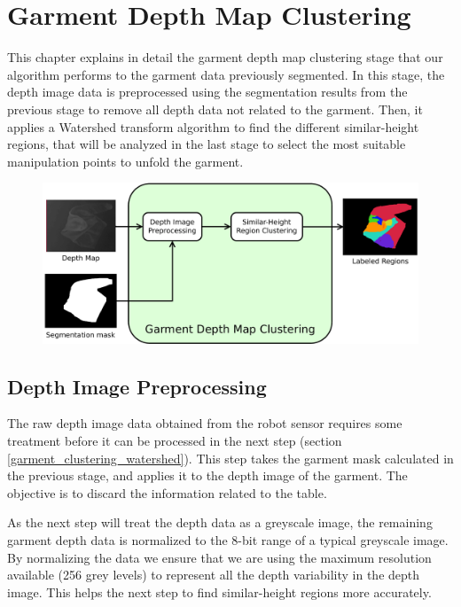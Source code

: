 \chapter{Garment Depth Map Clustering}
\label{garment_clustering}

This chapter explains in detail the garment depth map clustering stage that our algorithm performs to the garment data previously segmented. In this stage, the depth image data is preprocessed using the segmentation results from the previous stage to remove all depth data not related to the garment. Then, it applies a Watershed transform algorithm to find the different similar-height regions, that will be analyzed in the last stage to select the most suitable manipulation points to unfold the garment. 

\begin{figure}[thpb]
    \centering
    \includegraphics[width=\textwidth]
    {figures/Garment-depthmap-diagram.pdf}
    \caption{}
    \label{fig:garment_clustering_blocks}
\end{figure}

\section{Depth Image Preprocessing}
\label{depth_image_preprocessing}

The raw depth image data obtained from the robot sensor requires some treatment before it can be processed in the next step (section \ref{garment_clustering_watershed}). This step takes the garment mask calculated in the previous stage, and applies it to the depth image of the garment. The objective is to discard the information related to the table. 

As the next step will treat the depth data as a greyscale image, the remaining garment depth data is normalized to the 8-bit range of a typical greyscale image. By normalizing the data we ensure that we are using the maximum resolution available (256 grey levels) to represent all the depth variability in the depth image. This helps the next step to find similar-height regions more accurately.

